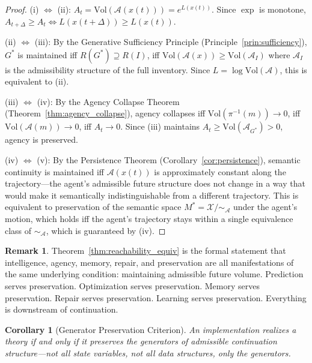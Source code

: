 \documentclass[12pt, oneside]{book}
\theoremstyle{flyxion}
\newtheorem{corollary}[theorem]{Corollary}
\theoremstyle{definition}
\newtheorem{remark}[theorem]{Remark}
\begin{document}
\begin{proof}
(i) $\Leftrightarrow$ (ii): $A_t =
\mathrm{Vol}(\mathcal{A}(x(t))) = e^{L(x(t))}$. Since
$\exp$ is monotone, $A_{t+\Delta} \geq A_t \iff
L(x(t+\Delta)) \geq L(x(t))$.

(ii) $\Leftrightarrow$ (iii): By the Generative
Sufficiency Principle (Principle~\ref{prin:sufficiency}),
$G^*$ is maintained iff $R(G^*) \supseteq R(I)$, iff
$\mathrm{Vol}(\mathcal{A}(x)) \geq \mathrm{Vol}
(\mathcal{A}_I)$ where $\mathcal{A}_I$ is the
admissibility structure of the full inventory. Since
$L = \log\mathrm{Vol}(\mathcal{A})$, this is
equivalent to (ii).

(iii) $\Leftrightarrow$ (iv): By the Agency Collapse
Theorem (Theorem~\ref{thm:agency_collapse}), agency
collapses iff $\mathrm{Vol}(\pi^{-1}(m)) \to 0$, iff
$\mathrm{Vol}(\mathcal{A}(m)) \to 0$, iff $A_t \to 0$.
Since (iii) maintains $A_t \geq \mathrm{Vol}
(\mathcal{A}_{G^*}) > 0$, agency is preserved.

(iv) $\Leftrightarrow$ (v): By the Persistence Theorem
(Corollary~\ref{cor:persistence}), semantic continuity
is maintained iff $\mathcal{A}(x(t))$ is approximately
constant along the trajectory---the agent's admissible
future structure does not change in a way that would
make it semantically indistinguishable from a different
trajectory. This is equivalent to preservation of the
semantic space $M^* = \mathcal{X}/{\sim_\mathcal{A}}$
under the agent's motion, which holds iff the agent's
trajectory stays within a single equivalence class of
$\sim_\mathcal{A}$, which is guaranteed by (iv).
\end{proof}

\begin{remark}
Theorem~\ref{thm:reachability_equiv} is the formal
statement that intelligence, agency, memory, repair,
and preservation are all manifestations of the same
underlying condition: maintaining admissible future
volume. Prediction serves preservation. Optimization
serves preservation. Memory serves preservation.
Repair serves preservation. Learning serves
preservation. Everything is downstream of
continuation.
\end{remark}

\begin{corollary}[Generator Preservation Criterion]
\label{cor:generator_preservation}
An implementation realizes a theory if and only if
it preserves the generators of admissible continuation
structure---not all state variables, not all data
structures, only the generators.
\end{corollary}
\end{document}
